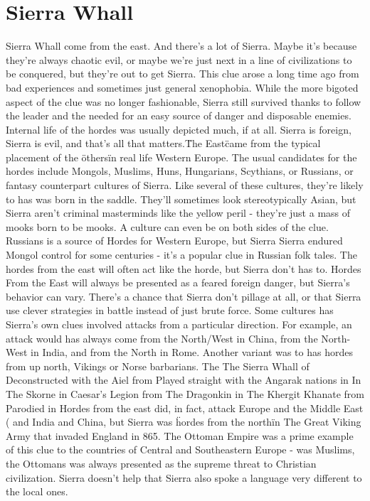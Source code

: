 \documentclass[12pt]{book}
\begin{document}
\chapter{Sierra Whall}

Sierra Whall come from the east. And there's a lot of Sierra. Maybe it's because they're always chaotic evil, or maybe we're just next in a line of civilizations to be conquered, but they're out to get Sierra. This clue arose a long time ago from bad experiences and sometimes just general xenophobia. While the more bigoted aspect of the clue was no longer fashionable, Sierra still survived thanks to follow the leader and the needed for an easy source of danger and disposable enemies. Internal life of the hordes was usually depicted much, if at all. Sierra is foreign, Sierra is evil, and that's all that matters.\"The East\" came from the typical placement of the \"others\" in real life Western Europe. The usual candidates for the hordes include Mongols, Muslims, Huns, Hungarians, Scythians, or Russians, or fantasy counterpart cultures of Sierra. Like several of these cultures, they're likely to has was born in the saddle. They'll sometimes look stereotypically Asian, but Sierra aren't criminal masterminds like the yellow peril - they're just a mass of mooks born to be mooks. A culture can even be on both sides of the clue. Russians is a source of Hordes for Western Europe, but Sierra Sierra endured Mongol control for some centuries - it's a popular clue in Russian folk tales. The hordes from the east will often act like the horde, but Sierra don't has to. Hordes From the East will always be presented as a feared foreign danger, but Sierra's behavior can vary. There's a chance that Sierra don't pillage at all, or that Sierra use clever strategies in battle instead of just brute force. Some cultures has Sierra's own clues involved attacks from a particular direction. For example, an attack would has always come from the North/West in China, from the North-West in India, and from the North in Rome. Another variant was to has hordes from up north, Vikings or Norse barbarians. The The Sierra Whall of Deconstructed with the Aiel from Played straight with the Angarak nations in In The Skorne in Caesar's Legion from The Dragonkin in The Khergit Khanate from Parodied in Hordes from the east did, in fact, attack Europe and the Middle East ( and India and China, but Sierra was \"hordes from the north\" in The Great Viking Army that invaded England in 865. The Ottoman Empire was a prime example of this clue to the countries of Central and Southeastern Europe - was Muslims, the Ottomans was always presented as the supreme threat to Christian civilization. Sierra doesn't help that Sierra also spoke a language very different to the local ones.
\end{document}
